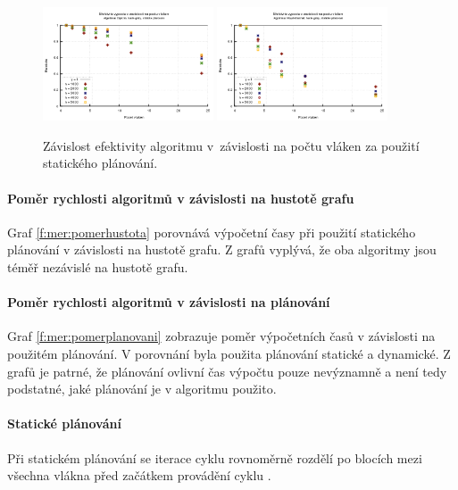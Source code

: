 \begin{figure}
    \centering
    \includegraphics[width=0.45\textwidth]{../grafy/02_openMP/02-03-Dijsktra_efektivita}
    \includegraphics[width=0.45\textwidth]{../grafy/02_openMP/02-03-Floyd_efektivita}
    \caption{Závislost efektivity algoritmu v~závislosti na počtu vláken za použití statického plánování.}
    \label{f:mer:efe}
\end{figure}

\paragraph{Poměr rychlosti algoritmů v závislosti na hustotě grafu}
Graf \ref{f:mer:pomerhustota} porovnává výpočetní časy při použití statického plánování v závislosti na hustotě grafu. Z grafů vyplývá, že oba algoritmy jsou téměř nezávislé na hustotě grafu.

\paragraph{Poměr rychlosti algoritmů v závislosti na plánování}
Graf \ref{f:mer:pomerplanovani} zobrazuje poměr výpočetních časů v závislosti na použitém plánování. V porovnání byla použita plánování statické a dynamické. Z grafů je patrné, že plánování ovlivní čas výpočtu pouze nevýznamně a není tedy podstatné, jaké plánování je v algoritmu použito.
\paragraph{Statické plánování}
Při statickém plánování se iterace cyklu rovnoměrně rozdělí po blocích mezi všechna vlákna před začátkem provádění cyklu \cite{w:omp}.
